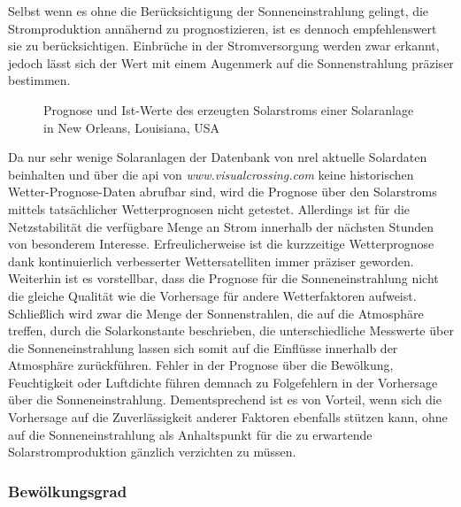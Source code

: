 \documentclass[12pt, a4paper]{article}
\begin{document}
Selbst wenn es ohne die Berücksichtigung der Sonneneinstrahlung gelingt, die Stromproduktion annähernd zu prognostizieren, ist es dennoch empfehlenswert sie zu berücksichtigen. Einbrüche in der Stromversorgung werden zwar erkannt, jedoch lässt sich der Wert mit einem Augenmerk auf die Sonnenstrahlung präziser bestimmen.

\begin{figure}
\centering
\def\svgwidth{400pt}

\caption{Prognose und Ist-Werte des erzeugten Solarstroms einer Solaranlage in New Orleans, Louisiana, USA}
\label{fig:predictions_1244}
\end {figure}

Da nur sehr wenige Solaranlagen der Datenbank von \ac{nrel} aktuelle Solardaten beinhalten und über die \ac{api} von \textit{www.visualcrossing.com} keine historischen Wetter-Prognose-Daten abrufbar sind, wird die Prognose über den Solarstroms mittels tatsächlicher Wetterprognosen nicht getestet. Allerdings ist für die Netzstabilität die verfügbare Menge an Strom innerhalb der nächsten Stunden von besonderem Interesse. Erfreulicherweise ist die kurzzeitige Wetterprognose dank kontinuierlich verbesserter Wettersatelliten immer präziser geworden. Weiterhin ist es vorstellbar, dass die Prognose für die Sonneneinstrahlung nicht die gleiche Qualität wie die Vorhersage für andere Wetterfaktoren aufweist. Schließlich wird zwar die Menge der Sonnenstrahlen, die auf die Atmosphäre treffen, durch die Solarkonstante beschrieben, die unterschiedliche Messwerte über die Sonneneinstrahlung lassen sich somit auf die Einflüsse innerhalb der Atmosphäre zurückführen. Fehler in der Prognose über die Bewölkung, Feuchtigkeit oder Luftdichte führen demnach zu Folgefehlern in der Vorhersage über die Sonneneinstrahlung. Dementsprechend ist es von Vorteil, wenn sich die Vorhersage auf die Zuverlässigkeit anderer Faktoren ebenfalls stützen kann, ohne auf die Sonneneinstrahlung als Anhaltspunkt für die zu erwartende Solarstromproduktion gänzlich verzichten zu müssen.

\subsubsection{Bewölkungsgrad}
\end{document}
